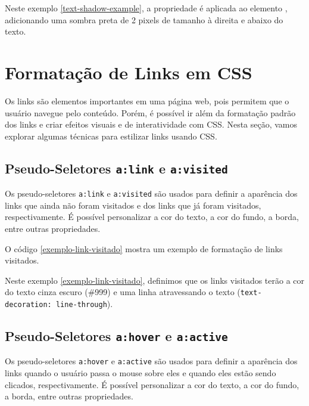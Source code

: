 Neste exemplo \ref{text-shadow-example}, a propriedade  é aplicada ao elemento , adicionando uma sombra preta de 2 pixels de tamanho à direita e abaixo do texto.

\section{Formatação de Links em CSS}

Os links são elementos importantes em uma página web, pois permitem que o usuário navegue pelo conteúdo. Porém, é possível ir além da formatação padrão dos links e criar efeitos visuais e de interatividade com CSS. Nesta seção, vamos explorar algumas técnicas para estilizar links usando CSS.

\subsection{Pseudo-Seletores \texttt{a:link} e \texttt{a:visited}}

Os pseudo-seletores \texttt{a:link} e \texttt{a:visited} são usados para definir a aparência dos links que ainda não foram visitados e dos links que já foram visitados, respectivamente. É possível personalizar a cor do texto, a cor do fundo, a borda, entre outras propriedades.

O código \ref{exemplo-link-visitado} mostra um exemplo de formatação de links visitados.


Neste exemplo \ref{exemplo-link-visitado}, definimos que os links visitados terão a cor do texto cinza escuro (\#999) e uma linha atravessando o texto (\texttt{text-decoration: line-through}).

\subsection{Pseudo-Seletores \texttt{a:hover} e \texttt{a:active}}

Os pseudo-seletores \texttt{a:hover} e \texttt{a:active} são usados para definir a aparência dos links quando o usuário passa o mouse sobre eles e quando eles estão sendo clicados, respectivamente. É possível personalizar a cor do texto, a cor do fundo, a borda, entre outras propriedades.

